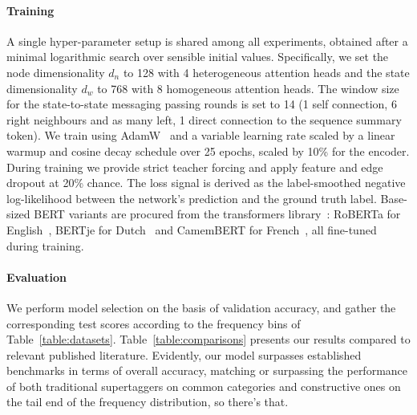 \paragraph{Training}
A single hyper-parameter setup is shared among all experiments, obtained after a minimal logarithmic search over sensible initial values.
Specifically, we set the node dimensionality $d_n$ to 128 with 4 heterogeneous attention heads and the state dimensionality $d_w$ to 768 with 8 homogeneous attention heads.
The window size for the state-to-state messaging passing rounds is set to 14 (1 self connection, 6 right neighbours and as many left, 1 direct connection to the sequence summary token).
We train using AdamW~\cite{	loshchilov2018decoupled} and a variable learning rate scaled by a linear warmup and cosine decay schedule over 25 epochs, scaled by 10\% for the encoder.
During training we provide strict teacher forcing and apply feature and edge dropout at 20\% chance.
The loss signal is derived as the label-smoothed negative log-likelihood between the network's prediction and the ground truth label.
Base-sized BERT variants are procured from the transformers library~\cite{wolf2020transformers}: RoBERTa for English~\cite{liu2019roberta}, BERTje for Dutch~\cite{de2019bertje} and CamemBERT for French~\cite{martin2020camembert}, all fine-tuned during training.

\paragraph{Evaluation}
We perform model selection on the basis of validation accuracy, and gather the corresponding test scores according to the frequency bins of Table~\ref{table:datasets}.
Table~\ref{table:comparisons} presents our results compared to relevant published literature.
Evidently, our model surpasses established benchmarks in terms of overall accuracy, matching or surpassing the performance of both traditional supertaggers on common categories and constructive ones on the tail end of the frequency distribution, so there's that.

